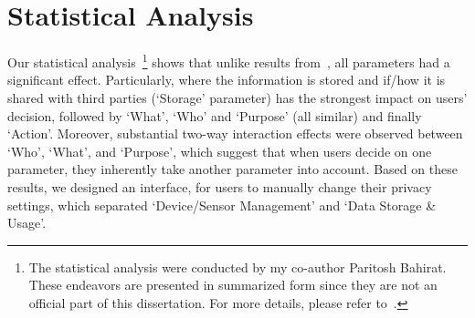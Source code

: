 %

\section{Statistical Analysis}\label{sec:statAlys2}
Our statistical analysis~\footnote{The statistical analysis were conducted by my co-author Paritosh Bahirat. These endeavors are presented in summarized form since they are not an official part of this dissertation. For more details, please refer to~\cite{He2018data}.} shows that unlike results from~\cite{bahiratiui2018}, all parameters had a significant effect. Particularly, where the information is stored and if/how it is shared with third parties (`Storage' parameter) has the strongest impact on users' decision, followed by `What', `Who' and `Purpose' (all similar) and finally `Action'. Moreover, substantial two-way interaction effects were observed between `Who', `What', and `Purpose', which suggest that when users decide on one parameter, they inherently take another parameter into account. Based on these results, we designed an interface, for users to manually change their privacy settings, which separated `Device/Sensor Management' and `Data Storage \& Usage'. 

